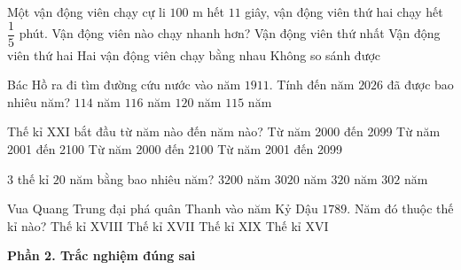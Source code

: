 \begin{ex} %
Một vận động viên chạy cự li $100\text{ m}$ hết $11$ giây, vận động viên thứ hai chạy hết $\dfrac{1}{5}$ phút. Vận động viên nào chạy nhanh hơn?
\choice
{\True Vận động viên thứ nhất}
{Vận động viên thứ hai}
{Hai vận động viên chạy bằng nhau}
{Không so sánh được}
\end{ex}

\begin{ex} %
Bác Hồ ra đi tìm đường cứu nước vào năm $1911$. Tính đến năm $2026$ đã được bao nhiêu năm?
\choice
{$114$ năm}
{$116$ năm}
{$120$ năm}
{\True $115$ năm}
\end{ex}

\begin{ex} %
Thế kỉ XXI bắt đầu từ năm nào đến năm nào?
\choice
{Từ năm 2000 đến 2099}
{\True Từ năm 2001 đến 2100}
{Từ năm 2000 đến 2100}
{Từ năm 2001 đến 2099}
\end{ex}

\begin{ex} %
$3$ thế kỉ $20$ năm bằng bao nhiêu năm?
\choice
{$3200$ năm}
{$3020$ năm}
{\True $320$ năm}
{$302$ năm}
\end{ex}

\begin{ex} %
Vua Quang Trung đại phá quân Thanh vào năm Kỷ Dậu $1789$. Năm đó thuộc thế kỉ nào?
\choice
{\True Thế kỉ XVIII}
{Thế kỉ XVII}
{Thế kỉ XIX}
{Thế kỉ XVI}
\end{ex}

\textbf{Phần 2. Trắc nghiệm đúng sai}

